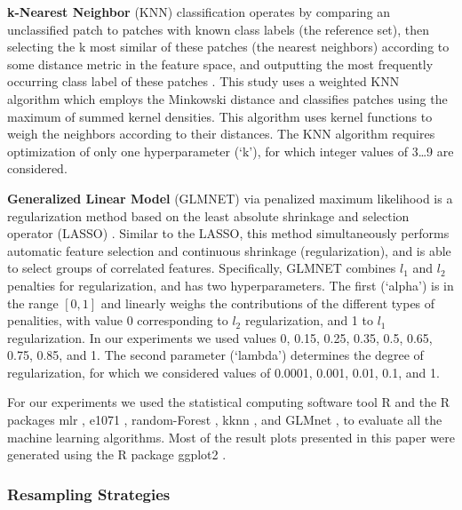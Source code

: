 {\bf k-Nearest Neighbor} (KNN) classification operates by comparing an unclassified patch to patches with known class labels (the reference set), then selecting the k most similar of these patches (the nearest neighbors) according to some distance metric in the feature space, and outputting the most frequently occurring class label of these patches \cite{cover1967nearest}. This study uses a weighted KNN algorithm \cite{hechenbichler2004weighted} which employs the Minkowski distance and classifies patches using the maximum of summed kernel densities. This algorithm uses kernel functions to weigh the neighbors according to their distances. The KNN algorithm requires optimization of only one hyperparameter (`k'), for which integer values of 3\dots9 are considered.

{\bf Generalized Linear Model} (GLMNET) via penalized maximum likelihood \cite{friedman2010regularization} is a regularization method based on the least absolute shrinkage and selection operator (LASSO) \cite{tibshirani1996regression}. Similar to the LASSO, this method simultaneously performs automatic feature selection and continuous shrinkage (regularization), and is able to select groups of correlated features. Specifically, GLMNET combines $l_1$ and $l_2$ penalties for regularization, and has two hyperparameters. The first (`alpha') is in the range $[0,1]$ and linearly weighs the contributions of the different types of penalities, with value 0 corresponding to $l_2$ regularization, and 1 to $l_1$ regularization. In our experiments we used values 0, 0.15, 0.25, 0.35, 0.5, 0.65, 0.75, 0.85, and 1. The second parameter (`lambda') determines the degree of regularization, for which we considered values of 0.0001, 0.001, 0.01, 0.1, and 1.

For our experiments we used the statistical computing software tool R \cite{bischl2016mlr} and the R packages mlr \cite{mlrpackage2016}, e1071 \cite{e1071}, random-Forest \cite{randomForest}, kknn \cite{kknn}, and GLMnet \cite{glmnet}, to evaluate all the machine learning algorithms. Most of the result plots presented in this paper were generated using the R package ggplot2 \cite{Wickham-2009}.

\subsubsection{Resampling Strategies}
\label{subsubsec:resampling}

